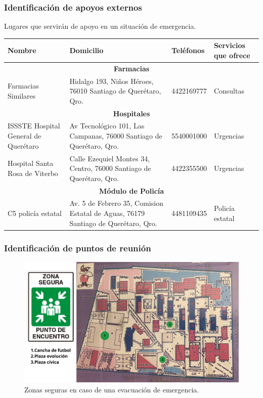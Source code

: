     \centering
    \subsubsection{ Identificación de apoyos externos}
    
    Lugares que servirán de apoyo en un situación de emergencia.
    
    \begin{tabular}{|p{5em}|p{6em}|p{5em}|p{4em}|}
             \hline
             \textbf{Nombre}& \textbf{Domicilio}& \textbf{Teléfonos}& \textbf{Servicios que ofrece}\\
            \hline
        \multicolumn{4}{c}{\textbf{Farmacias}}\\
        \hline
             Farmacias Similares &Hidalgo 193, Niños Héroes, 76010 Santiago de Querétaro, Qro.& 4422169777& Consultas\\
             \hline
             \multicolumn{4}{c}{\textbf{Hospitales}}\\
        \hline
              ISSSTE Hospital General de Querétaro& Av Tecnológico 101, Las Campanas, 76000 Santiago de Querétaro, Qro.&5540001000&Urgencias\\
              \hline
              Hospital Santa Rosa de Viterbo& Calle Ezequiel Montes 34, Centro, 76000 Santiago de Querétaro, Qro.& 4422355500&Urgencias\\
              \hline
             \multicolumn{4}{c}{\textbf{Módulo de Policía}}\\
        \hline
             C5 policía estatal&Av. 5 de Febrero 35, Comision Estatal de Aguas, 76179 Santiago de Querétaro, Qro.& 4481109435&Policía estatal\\         
              \hline
         \end{tabular}
    
    
    \subsubsection{Identificación de puntos de reunión}
    
    \begin{figure}[H]
        \centering
        \includegraphics[scale=0.15]{34/img/puntosDeReunion.png}
        \caption{Zonas seguras en caso de una evacuación de emergencia.}
        \label{fig:puntosDeReunion}
    \end{figure}
    
